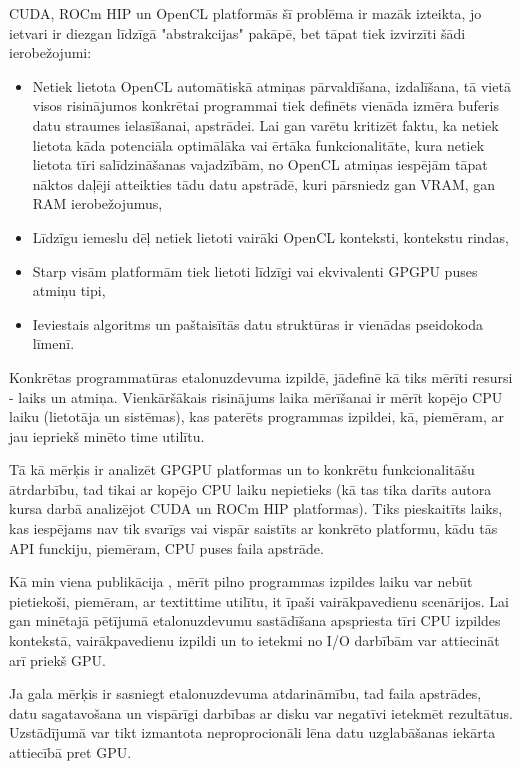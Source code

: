 CUDA, ROCm HIP un OpenCL platformās šī problēma ir mazāk izteikta, jo ietvari
ir diezgan līdzīgā "abstrakcijas" pakāpē, bet tāpat tiek izvirzīti šādi
ierobežojumi:
\begin{itemize}
    \item Netiek lietota OpenCL automātiskā atmiņas pārvaldīšana, izdalīšana,
        tā vietā visos risinājumos konkrētai programmai tiek definēts vienāda
        izmēra buferis datu straumes ielasīšanai, apstrādei. Lai gan varētu kritizēt
        faktu, ka netiek lietota kāda potenciāla optimālāka  vai ērtāka
        funkcionalitāte, kura netiek lietota tīri salīdzināšanas vajadzībām, no
        OpenCL atmiņas iespējām tāpat nāktos daļēji atteikties tādu datu
        apstrādē, kuri pārsniedz gan VRAM, gan RAM ierobežojumus,
    \item Līdzīgu iemeslu dēļ netiek lietoti vairāki OpenCL konteksti,
        kontekstu rindas,
    \item Starp visām platformām tiek lietoti līdzīgi vai ekvivalenti GPGPU
        puses atmiņu tipi,
    \item Ieviestais algoritms un paštaisītās datu struktūras ir vienādas
        pseidokoda līmenī.
\end{itemize}

Konkrētas programmatūras etalonuzdevuma izpildē, jādefinē kā tiks mērīti
resursi - laiks un atmiņa. Vienkāršākais risinājums laika mērīšanai ir mērīt
kopējo CPU laiku (lietotāja un sistēmas), kas paterēts programmas izpildei, kā,
piemēram, ar jau iepriekš minēto time utilītu.

Tā kā mērķis ir analizēt GPGPU platformas un to konkrētu funkcionalitāšu
ātrdarbību, tad tikai ar kopējo CPU laiku nepietieks (kā tas tika darīts autora
kursa darbā analizējot CUDA un ROCm HIP platformas\cite{kursa-darbs}). Tiks
pieskaitīts laiks, kas iespējams nav tik svarīgs vai vispār saistīts ar
konkrēto platformu, kādu tās API funckiju, piemēram, CPU puses faila apstrāde.

Kā min viena publikācija \cite{reliable-benchmarking}, mērīt pilno programmas
izpildes laiku var nebūt pietiekoši, piemēram, ar textit{time} utilītu, it
īpaši vairākpavedienu scenārijos. Lai gan minētajā pētījumā etalonuzdevumu
sastādīšana apspriesta tīri CPU izpildes kontekstā, vairākpavedienu izpildi un
to ietekmi no I/O darbībām var attiecināt arī priekš GPU.

Ja gala mērķis ir sasniegt etalonuzdevuma atdarināmību, tad faila apstrādes,
datu sagatavošana un vispārīgi darbības ar disku var negatīvi ietekmēt
rezultātus. Uzstādījumā var tikt izmantota neproprocionāli lēna datu
uzglabāšanas iekārta attiecībā pret GPU.

